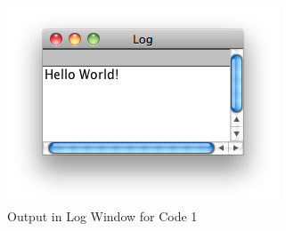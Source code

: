 \documentclass[11pt,a4paper,oneside]{report}
\begin{document}
\begin{figure}[htbp]
\begin{center}
\includegraphics[scale=0.6]{fig/Log_HelloWorld.png}
\caption{Output in Log Window for Code 1} \label{fig23-1}
\end{center}
\end{figure}
\end{document}
